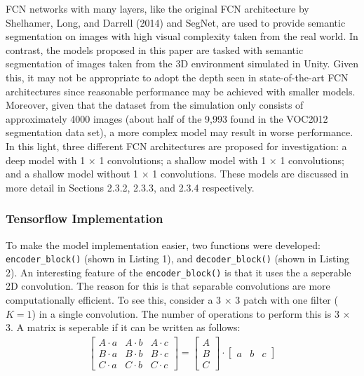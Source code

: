 \documentclass[a4paper]{article}
\begin{document}
FCN networks with many layers, like the original FCN architecture by Shelhamer, Long, and Darrell (2014) and SegNet, are used to provide semantic segmentation on images with high visual complexity taken from the real world. In contrast, the models proposed in this paper are tasked with semantic segmentation of images taken from the 3D environment simulated in Unity. Given this, it may not be appropriate to adopt the depth seen in state-of-the-art FCN architectures since reasonable performance may be achieved with smaller models. Moreover, given that the dataset from the simulation only consists of approximately 4000 images (about half of the 9,993 found in the VOC2012 segmentation data set), a more complex model may result in worse performance. In this light, three different FCN architectures are proposed for investigation: a deep model with 1 $\times$ 1 convolutions; a shallow model with 1 $\times$ 1 convolutions; and a shallow model without 1 $\times$ 1 convolutions. These models are discussed in more detail in Sections 2.3.2, 2.3.3, and 2.3.4 respectively. 

\subsubsection{Tensorflow Implementation}
To make the model implementation easier, two functions were developed: \verb|encoder_block()| (shown in Listing 1), and \verb|decoder_block()| (shown in Listing 2). An interesting feature of the \verb|encoder_block()| is that it uses the a seperable 2D convolution. The reason for this is that separable convolutions are more computationally efficient. To see this, consider a 3 $\times$ 3 patch with one filter ($K = 1$) in a single convolution. The number of operations to perform this is 3 $\times$ 3. A matrix is seperable if it can be written as follows:
\begin{align}
\begin{bmatrix}
A \cdot a & A \cdot b & A \cdot c\\
B \cdot a & B \cdot b & B \cdot c\\
C \cdot a & C \cdot b & C \cdot c
\end{bmatrix}
=
\begin{bmatrix}
A\\
B\\
C
\end{bmatrix}
\cdot
\begin{bmatrix}
a & b & c
\end{bmatrix}
\end{align}  
\end{document}
